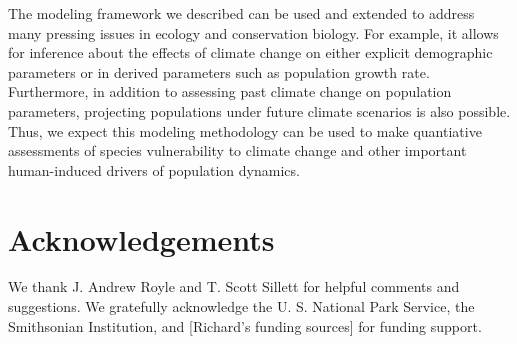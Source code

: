 \documentclass[12pt]{article}
\begin{document}
The modeling framework we described can be used and extended to address many
pressing issues in ecology and conservation biology. For
example,
it allows for inference %
about the effects of climate change on either explicit
demographic parameters or in derived parameters such as
population growth rate. Furthermore, %
in addition to assessing past climate change on population
parameters, projecting populations under future climate scenarios is also
possible. Thus, we expect this modeling methodology can be used
to make quantiative assessments of species vulnerability to climate
change and other important human-induced drivers of population
dynamics.


\section{Acknowledgements}

We thank J. Andrew Royle and T. Scott Sillett for helpful
comments and suggestions. We gratefully acknowledge the U. S. National Park 
Service, the Smithsonian Institution, and [Richard's funding sources] for funding support.




\newpage

\end{document}
